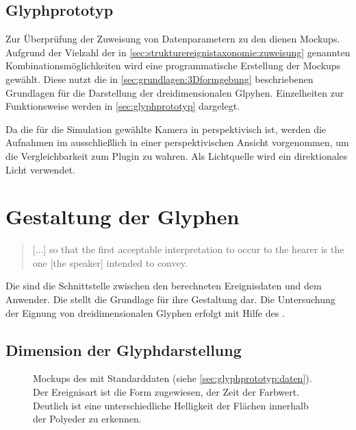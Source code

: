 \subsection*{Glyphprototyp}
Zur Überprüfung der Zuweisung von Datenparametern zu den  dienen Mockups. Aufgrund der Vielzahl der in \autoref{sec:strukturereignistaxonomie:zuweisung} genannten Kombinationsmöglichkeiten wird eine programmatische Erstellung der Mockups gewählt. Diese nutzt die in \autoref{sec:grundlagen:3Dformgebung} beschriebenen Grundlagen für die Darstellung der dreidimensionalen Glpyhen. Einzelheiten zur Funktionsweise werden in \autoref{sec:glyphprototyp} dargelegt.

Da die für die Simulation gewählte Kamera in  perspektivisch ist, werden die Aufnahmen im  ausschließlich in einer perspektivischen Ansicht vorgenommen, um die Vergleichbarkeit zum Plugin zu wahren. Als Lichtquelle wird ein direktionales Licht verwendet.


\section{Gestaltung der Glyphen}\label{sec:visualisierung:glyphen}
\blockcquote[64]{infantidou2001evidentials}{[...] so that the first acceptable interpretation to occur to the hearer is the one [the speaker] intended to convey.}

Die  sind die Schnittstelle zwischen den berechneten Ereignisdaten und dem Anwender. Die  stellt die Grundlage für ihre Gestaltung dar. Die Untersuchung der Eignung von dreidimensionalen Glyphen erfolgt mit Hilfe des .

\subsection*{Dimension der Glyphdarstellung}\label{sec:visualisierung:glyphen3d}

\begin{figure}
	{\caption{Mockups des  mit Standarddaten (siehe \autoref{sec:glyphprototyp:daten}). Der Ereignisart ist die Form zugewiesen, der Zeit der Farbwert. Deutlich ist eine unterschiedliche Helligkeit der Flächen innerhalb der Polyeder zu erkennen.}\label{fig:vis:mockup-form}}
\end{figure}

